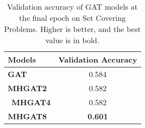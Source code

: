 \begin{table}[htb!]
    \centering
    \begin{tabular}{|l c|}
        \hline
        \textbf{Models} & \textbf{Validation Accuracy}\\
        \hline
        \textbf{GAT} & 0.584\\
        \textbf{MHGAT2} & 0.582\\\
        \textbf{MHGAT4} & 0.582\\
        \textbf{MHGAT8} & \textbf{0.601}\\
        \hline
    \end{tabular}
    \caption{Validation accuracy of GAT models at the final epoch on Set Covering Problems.
    Higher is better, and the best value is in bold.}
    \label{tab:sc-validation-accuracy}
\end{table}